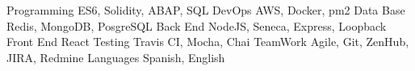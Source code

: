 


\begin{cvskills}

\cvskill
{Programming} %
{ES6, Solidity, ABAP, SQL} %
\cvskill
{DevOps} %
{AWS, Docker, pm2} %
\cvskill
{Data Base} %
{Redis, MongoDB, PosgreSQL} %
\cvskill
{Back End} %
{NodeJS,  Seneca, Express, Loopback} %
\cvskill
{Front End} %
{React} %
\cvskill
{Testing} %
{Travis CI, Mocha, Chai} %
\cvskill
{TeamWork} %
{Agile, Git, ZenHub, JIRA, Redmine} %
\cvskill
{Languages} %
{Spanish, English} %
\end{cvskills}
